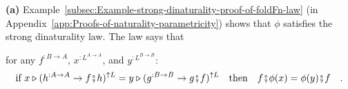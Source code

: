 \textbf{(a)} Example~\ref{subsec:Example-strong-dinaturality-proof-of-foldFn-law}
(in Appendix~\ref{app:Proofs-of-naturality-parametricity}) shows
that $\phi$ satisfies the strong dinaturality law. The law says that
\begin{comment}
Begin by formulating the relational naturality law of $\phi$: for
all $r^{:A\leftrightarrow B}$,
\[
\text{if }(x^{:L^{A\rightarrow A}},y^{:L^{B\rightarrow B}})\in r^{\updownarrow(L\circ E)}\text{ then }(\phi(x),\phi(y))\in r^{\updownarrow E}\quad.
\]
In order to use this law to derive Eq.~(\ref{eq:first-special-law-of-phi}),
we need to choose a specific relation $r$ and specific types $A$
and $B$. Note that the value $p\triangleright\text{inMF}^{\uparrow L}$
in Eq.~(\ref{eq:first-special-law-of-phi}) has type $L^{E^{A}\rightarrow E^{A}}$.
So, the only hope of using Eq.~(\ref{eq:relational-law-of-g}) is
by choosing the type $B$ as $B\triangleq E^{A}=A\rightarrow A$. 

It remains to choose a suitable relation $r$ between the types $A$
and $B\triangleq A\rightarrow A$. In Eq.~(\ref{eq:relational-law-of-g}),
the relation $r$ is being lifted to the functor $L\circ E$, which
is equivalent to the lifting $(r^{\updownarrow E})^{\updownarrow L}$.
Since $L$ is an unknown functor, we do not have a general formula
for lifting an arbitrary relation $r$ to $L\circ E$. However, we
do have a formula for lifting a relation $r^{:A\leftrightarrow B}$
that comes from a function (either of type $A\rightarrow B$ or of
type $B\rightarrow A$). For instance, given a function $f:B\rightarrow A$,
we define $r\triangleq\text{rev}\left<f\right>$. First we lift $\left<f\right>^{\updownarrow E}$
as:
\[
(g^{:B\rightarrow B},h^{:A\rightarrow A})\in\left<f\right>^{\updownarrow E}\text{ means }g\bef f=f\bef h\quad.
\]
This is a relation of pullback form:
\[
\left<f\right>^{\updownarrow E}=\text{pull}\,\big(g^{:B\rightarrow B}\rightarrow g\bef f,\quad h^{:A\rightarrow A}\rightarrow f\bef h\big)\quad.
\]
A pullback relation can then be lifted to a functor $L$ as shown
in Statement~\ref{subsec:Statement-pullback-as-composition}:
\[
\left<f\right>^{\updownarrow E\updownarrow L}=\text{pull}\,\big((g^{:B\rightarrow B}\rightarrow g\bef f)^{\uparrow L},\quad(h^{:A\rightarrow A}\rightarrow f\bef h)^{\uparrow L}\big)\quad.
\]
We can now rewrite Eq.~ in the form of a chain of pullback relations: 
\end{comment}
for any $f^{:B\rightarrow A}$, $x^{:L^{A\rightarrow A}}$, and $y^{:L^{B\rightarrow B}}$:
\begin{equation}
\text{if }x\triangleright(h^{:A\rightarrow A}\rightarrow f\bef h)^{\uparrow L}=y\triangleright(g^{:B\rightarrow B}\rightarrow g\bef f)^{\uparrow L}\quad\text{then}\quad f\bef\phi(x)=\phi(y)\bef f\quad.\label{eq:strong-dinaturality-law-of-phi-with-f}
\end{equation}
